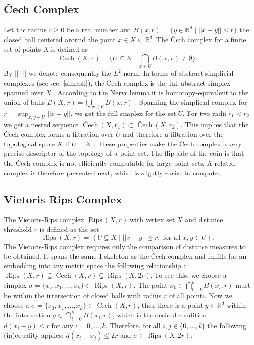 \documentclass[runningheads]{llncs}
\DeclareMathOperator{\Cech}{\text{\v{C}ech}}
\DeclareMathOperator{\Rips}{\text{Rips}}
\begin{document}
\subsection{\v{C}ech Complex}
Let the radius $r \geq 0$ be a real number and $B(x,r) = \{y \in \mathbb{R}^d \; | \; ||x-y|| \leq r\}$ the closed ball centered around the point $x \in X \subseteq \mathbb{R}^d$. The \v{C}ech complex for a finite set of points $X$ is defined as
\begin{equation}
  \Cech(X,r) = \{ U \subseteq X  \; \rvert \; \bigcap_{x\in U}B(x,r) \neq \emptyset \}.
\end{equation}
By $||\cdot||$ we denote consequently the $L^2$-norm. In terms of abstract simplicial complexes (see sec. \ref{simcoll}), the \v{C}ech complex is the full abstract simplex spanned over $X$ \cite{bauer2017morse}. According to the Nerve lemma it is homotopy-equivalent to the union of balls $B(X,r) = \bigcup_{x \in U} B(x,r)$ \cite{borsuk}. Spanning the simplicial complex for $r = \sup_{x,y \in U} ||x-y||$, we get the full simplex for the set $U$. For two radii $r_1 < r_2$ we get a nested sequence $\Cech(X,r_1) \subset \Cech(X,r_2)$. This implies that the \v{C}ech complex forms a filtration over $U$ and therefore a filtration over the topological space $X$ if $U = X$ \cite{bauer2017morse}. These properties make the \v{C}ech complex a very precise descriptor of the topology of a point set. The flip side of the coin is that the \v{C}ech complex is not efficiently computable for large point sets. A related complex is therefore presented next, which is slightly easier to compute.

\subsection{Vietoris-Rips Complex}
The Vietoris-Rips complex $\Rips(X,r)$ with vertex set $X$ and distance threshold $r$ is defined as the set
\begin{equation}
  \label{rips}
\Rips(X,r) = \left\{ U \subseteq X \; \bigg\rvert \; ||x-y|| \leq r, \; \text{for all} \; x,y \in U \right\}.
\end{equation}
The Vietoris-Rips complex requires only the comparison of distance measures to be obtained. It spans the same $1$-skeleton as the \v{C}ech complex and fulfills for an embedding into any metric space the following relationship \cite[p.~15]{boissonnat2018geometric}: $\Rips(X,r)\subseteq \Cech(X,r) \subseteq \Rips(X,2r).$ To see this, we choose a simplex $\sigma = \{x_0,x_1,\ldots,x_k\} \in \Rips(X,r)$. The point $x_0 \in \bigcap_{i=0}^{k}B(x_i,r)$ must be within the intersection of closed balls with radius $r$ of all points. Now we choose a $\sigma = \{x_0,x_1,\ldots,x_k\} \in \Cech(X,r)$, then there is a point $y \in \mathbb{R}^d$ within the intersection $y \in \bigcap_{i=0}^{k}B(x_i,r)$, which is the desired condition $d(x_i-y) \leq r$ for any $i = 0,\ldots,k$. Therefore, for all $i,j \in \{0,\ldots,k\}$ the following (in)equality applies: $d(x_i-x_j) \leq 2r$ and $\sigma \in \Rips(X,2r)$.
\end{document}
